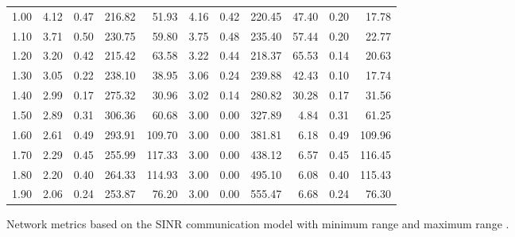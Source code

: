 \documentclass{article}
\begin{document}
\begin{figure}[h]
\begin{center}
\begin{tabular}{|r|rr|rr|rr|rr|rr|}
1.00 & 4.12 & 0.47 & 216.82 & 51.93 & 4.16 & 0.42 & 220.45 & 47.40 & 0.20 & 17.78\\
1.10 & 3.71 & 0.50 & 230.75 & 59.80 & 3.75 & 0.48 & 235.40 & 57.44 & 0.20 & 22.77\\
1.20 & 3.20 & 0.42 & 215.42 & 63.58 & 3.22 & 0.44 & 218.37 & 65.53 & 0.14 & 20.63\\
1.30 & 3.05 & 0.22 & 238.10 & 38.95 & 3.06 & 0.24 & 239.88 & 42.43 & 0.10 & 17.74\\
1.40 & 2.99 & 0.17 & 275.32 & 30.96 & 3.02 & 0.14 & 280.82 & 30.28 & 0.17 & 31.56\\
1.50 & 2.89 & 0.31 & 306.36 & 60.68 & 3.00 & 0.00 & 327.89 &  4.84 & 0.31 & 61.25\\
1.60 & 2.61 & 0.49 & 293.91 & 109.70 & 3.00 & 0.00 & 381.81 & 6.18 & 0.49 & 109.96\\
1.70 & 2.29 & 0.45 & 255.99 & 117.33 & 3.00 & 0.00 & 438.12 & 6.57 & 0.45 & 116.45\\
1.80 & 2.20 & 0.40 & 264.33 & 114.93 & 3.00 & 0.00 & 495.10 & 6.08 & 0.40 & 115.43\\
1.90 & 2.06 & 0.24 & 253.87 &  76.20 & 3.00 & 0.00 & 555.47 & 6.68 & 0.24 &  76.30\\
\hline
\end{tabular}
\caption{Network metrics based on the SINR communication model with minimum range  and maximum range .}
\label{exp_sinr}
\end{center}
\end{figure}
\end{document}
